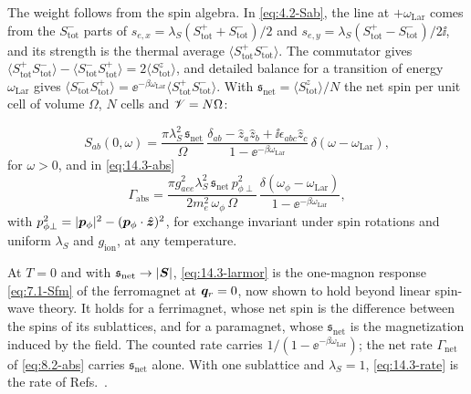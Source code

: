 The weight follows from the spin algebra. In \cref{eq:4.2-Sab}, the line at $+\omega_{\mathrm{Lar}}$ comes from the $S^-_{\mathrm{tot}}$ parts of $s_{e,x} = \lambda_S(S^+_{\mathrm{tot}} + S^-_{\mathrm{tot}})/2$ and $s_{e,y} = \lambda_S(S^+_{\mathrm{tot}} - S^-_{\mathrm{tot}})/2\ii$, and its strength is the thermal average $\langle S^+_{\mathrm{tot}}S^-_{\mathrm{tot}}\rangle$. The commutator gives $\langle S^+_{\mathrm{tot}}S^-_{\mathrm{tot}}\rangle - \langle S^-_{\mathrm{tot}}S^+_{\mathrm{tot}}\rangle = 2\langle S^z_{\mathrm{tot}}\rangle$, and detailed balance for a transition of energy $\omega_{\mathrm{Lar}}$ gives $\langle S^-_{\mathrm{tot}}S^+_{\mathrm{tot}}\rangle = \ee^{-\beta\omega_{\mathrm{Lar}}}\langle S^+_{\mathrm{tot}}S^-_{\mathrm{tot}}\rangle$. With $\mathfrak{s}_{\mathrm{net}} = \langle S^z_{\mathrm{tot}}\rangle/N$ the net spin per unit cell of volume $\Omega$, $N$ cells and $\mathscr{V} = N\Omega$:
\begin{keyresult}
\begin{equation}
  S_{ab}(0,\omega) = \frac{\pi\lambda_S^2\,\mathfrak{s}_{\mathrm{net}}}{\Omega}\,\frac{\delta_{ab} - \hat z_a\hat z_b + \ii\epsilon_{abc}\hat z_c}{1 - \ee^{-\beta\omega_{\mathrm{Lar}}}}\,\delta(\omega - \omega_{\mathrm{Lar}}) ,
  \label{eq:14.3-larmor}
\end{equation}
for $\omega > 0$, and in \cref{eq:14.3-abs}
\begin{equation}
  \varGamma_{\mathrm{abs}} = \frac{\pi g_{aee}^2\lambda_S^2\,\mathfrak{s}_{\mathrm{net}}\,p_{\phi\perp}^2}{2m_e^2\,\omega_\phi\,\Omega}\,\frac{\delta(\omega_\phi - \omega_{\mathrm{Lar}})}{1 - \ee^{-\beta\omega_{\mathrm{Lar}}}} ,
  \label{eq:14.3-rate}
\end{equation}
with $p_{\phi\perp}^2 = |\bm{p}_\phi|^2 - (\bm{p}_\phi\cdot\hat{\bm{z}})^2$, for exchange invariant under spin rotations and uniform $\lambda_S$ and $g_{\mathrm{ion}}$, at any temperature.
\end{keyresult}
At $T = 0$ and with $\mathfrak{s}_{\mathrm{net}} \to |\bm{S}|$, \cref{eq:14.3-larmor} is the one-magnon response \cref{eq:7.1-Sfm} of the ferromagnet at $\bm{q}_r = 0$, now shown to hold beyond linear spin-wave theory. It holds for a ferrimagnet, whose net spin is the difference between the spins of its sublattices, and for a paramagnet, whose $\mathfrak{s}_{\mathrm{net}}$ is the magnetization induced by the field. The counted rate carries $1/(1 - \ee^{-\beta\omega_{\mathrm{Lar}}})$; the net rate $\varGamma_{\mathrm{net}}$ of \cref{eq:8.2-abs} carries $\mathfrak{s}_{\mathrm{net}}$ alone. With one sublattice and $\lambda_S = 1$, \cref{eq:14.3-rate} is the rate of Refs.~\cites[Eqs.~(27), (35)]{mitridate2020detectability}[Eqs.~(25)--(27)]{chigusa2020detecting}.

